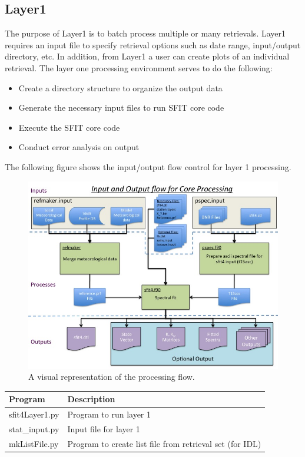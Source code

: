 \documentclass[12pt, letterpaper]{article}
\begin{document}
\subsection{Layer1}
The purpose of Layer1 is to batch process multiple or many retrievals. Layer1 requires an input file to specify retrieval options such as date range, input/output directory, etc. In addition, from Layer1 a user can create plots of an individual retrieval. The layer one processing environment serves to do the following:\\

\begin{itemize}
\item Create a directory structure to organize the output data
\item Generate the necessary input files to run SFIT core code
\item Execute the SFIT core code
\item Conduct error analysis on output
\end{itemize}

The following figure shows the input/output flow control for layer 1 processing.

\begin{figure}[H]
\includegraphics[width=1.0\textwidth]{Slide05}
\caption{A visual representation of the processing flow. }
\label{figure:Layer1Flow}
\end{figure}


\begin{tabular}{ l l }
\textbf{Program} & \textbf{Description} \\
\hline
sfit4Layer1.py      & Program to run layer 1\\
stat\_input.py       & Input file for layer 1\\
mkListFile.py       & Program to create list file from retrieval set (for IDL)\\
\end{tabular} \\
\end{document}
